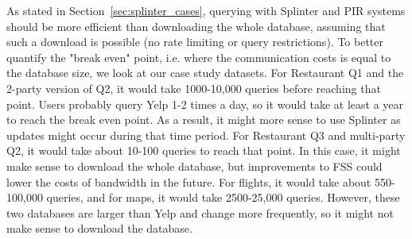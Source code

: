 As stated in Section~\ref{sec:splinter_cases}, querying with 
Splinter and PIR systems should be more efficient than
downloading the whole database, assuming that such a download is possible
(no rate limiting or query restrictions). To better quantify
the "break even" point, i.e. where the communication costs is equal
to the database size, we look at our case study datasets.
For Restaurant Q1 and the 2-party version of Q2, 
it would take 1000-10,000 queries before reaching that point. 
Users probably query Yelp 1-2 times a day, so it would take at least a year
to reach the break even point. As a result, it might more sense to use
Splinter as updates might occur during that time period.
For Restaurant Q3 and multi-party Q2, it would take about 10-100 queries to reach
that point. In this case, it might make sense to download the whole database, 
but improvements to FSS could lower the costs of bandwidth in the future.
For flights, it would take about 550-100,000 queries, and for maps,
it would take 2500-25,000 queries. However, these two databases are larger
than Yelp and change more frequently, so it might not make sense
to download the database.

